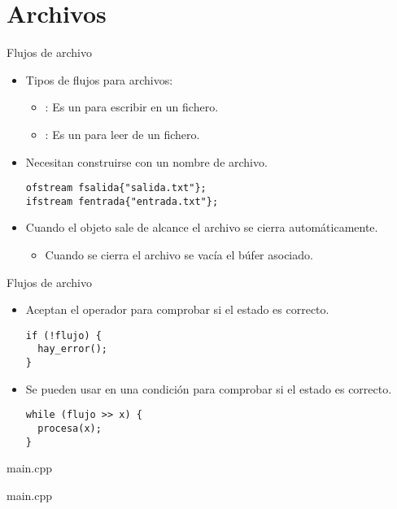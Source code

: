 \section{Archivos}

\begin{frame}[t,fragile]{Flujos de archivo}
\begin{itemize}
  \item Tipos de flujos para archivos:
    \begin{itemize}
      \item {}: Es un  para escribir en un fichero.
      \item {}: Es un  para leer de un fichero.
    \end{itemize}

  \item Necesitan construirse con un nombre de archivo.
\begin{lstlisting}
ofstream fsalida{"salida.txt"};
ifstream fentrada{"entrada.txt"};
\end{lstlisting}

  \item Cuando el objeto sale de alcance el archivo se cierra automáticamente.
    \begin{itemize}
      \item Cuando se cierra el archivo se vacía el búfer asociado.
    \end{itemize}
\end{itemize}
\end{frame}

\begin{frame}[t,fragile]{Flujos de archivo}
\begin{itemize}
  \item Aceptan el operador \cppkey{!} para comprobar si el estado es correcto.
\begin{lstlisting}
if (!flujo) { 
  hay_error(); 
}
\end{lstlisting}
  \item Se pueden usar en una condición para comprobar si el estado es correcto.
\begin{lstlisting}
while (flujo >> x) { 
  procesa(x); 
}
\end{lstlisting}
\end{itemize}
\end{frame}

 {

\begin{frame}[t]
\begin{block}{main.cpp}

\end{block}
\end{frame}

\begin{frame}[t]
\begin{block}{main.cpp}

\end{block}
\end{frame}

}

